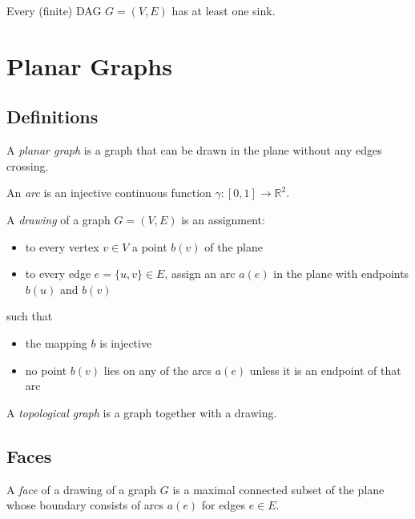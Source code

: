 \documentclass{classnotes}
\begin{document}
\begin{theorem}
    Every (finite) DAG $G = (V,E)$ has at least one sink.
\end{theorem}

\section{Planar Graphs}
\subsection{Definitions}
\begin{definition}
    A \emph{planar graph} is a graph that can be drawn in the plane without any edges crossing.
\end{definition}

\begin{definition}[Arc]
    An \emph{arc} is an injective continuous function $\gamma: [0,1] \to \mathbb{R}^2$.
\end{definition}

\begin{definition}[Drawing]
    A \emph{drawing} of  a graph $G=(V,E)$ is an assignment:
    \begin{itemize}
        \item to every vertex $v \in V$ a point $b(v)$ of the plane
        \item to every edge $e = \{u,v\} \in E$, assign an arc $a(e)$ in the plane with endpoints $b(u)$ and $b(v)$
    \end{itemize}
    such that
    \begin{itemize}
        \item the mapping $b$ is injective
        \item no point $b(v)$ lies on any of the arcs $a(e)$ unless it is an endpoint of that arc
    \end{itemize}
\end{definition}

\begin{definition}
    A \emph{topological graph} is a graph together with a drawing.
\end{definition}

\subsection{Faces}
\begin{definition}[Face]
    A \emph{face} of a drawing of a graph $G$ is a maximal connected subset of the plane whose boundary consists of arcs $a(e)$ for edges $e \in E$.
\end{definition}
\end{document}

